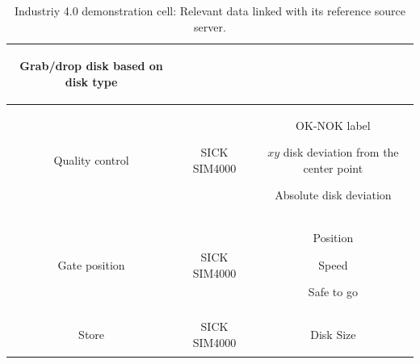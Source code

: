 \documentclass[5p,times,procedia]{elsarticle}
\begin{document}
\begin{table}
\begin{adjustbox}{width=.45\textwidth}
\begin{tabular}{ c c c }
\begin{minipage}[t]{0.2\textwidth}
\begin{description}
                     \item Grab/drop disk based on disk type
                     \end{description}
                     \end{minipage} \\ \hline
              Quality control      & SICK SIM4000      & \begin{minipage}[t]{0.2\textwidth}
              \begin{description}
                     \item OK-NOK label
                     \item $xy$ disk deviation from the center point
                     \item Absolute disk deviation
                     \end{description}
                     \end{minipage} \\ \hline
              Gate position        & SICK SIM4000      & \begin{minipage}[t]{0.2\textwidth}
              \begin{description}
                     \item Position
                     \item Speed
                     \item Safe to go
                     \end{description}
                     \end{minipage} \\ \hline
              Store       & SICK SIM4000      & \begin{minipage}[t]{0.2\textwidth}
                     \begin{description}
                     \item Disk Size
                     \end{description}
                   \end{minipage} \\ \bottomrule
       \end{tabular}
       \end{adjustbox}
       \caption{Industriy 4.0 demonstration cell: Relevant data linked with its reference source server.}
       \label{tab:data_source}
\end{table}
\end{document}
